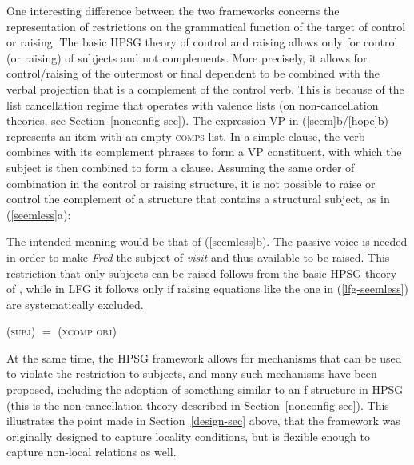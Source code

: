 \noindent
One interesting difference between the two frameworks concerns the representation of restrictions on the grammatical function of the target of control or raising.   The basic HPSG theory of control and raising \citep[for example, the one presented in][132--145]{ps2} allows only for control (or raising) of subjects and not complements.  More precisely, it allows for control/raising of the outermost or final dependent to be combined with the verbal projection that is a complement of the control verb.  This is because of the list cancellation regime that operates with valence lists (on non-cancellation theories, see Section~\ref{nonconfig-sec}).  The expression VP in  (\ref{seem}b/\ref{hope}b) represents an item with an empty \textsc{comps} list.  In a simple  clause, the verb combines with its complement phrases to form a VP constituent, with which the subject is then combined to form a clause.  Assuming the same order of combination in the control or raising structure, it is not possible to raise or control the complement of a structure that contains a structural subject, as in (\ref{seemless}a):

\begin{exe} 
\ex 
\label{seemless}
\begin{xlist}
\end{xlist}
\end{exe}
The intended meaning would be that of (\ref{seemless}b).  The passive voice is needed in order to make \textit{Fred} the subject of \textit{visit} and thus available to be raised.  This restriction that only subjects can be raised follows from the basic HPSG theory of \citet[132-145]{ps2}, while in LFG it follows only if raising equations like the one in (\ref{lfg-seemless}) are systematically excluded.
\begin{exe} 
\ex 
\label{lfg-seemless}
 {(\up \textsc{subj})  $=$  (\up \textsc{xcomp} \textsc{obj})}
\end{exe}
At the same time, the HPSG framework allows for mechanisms that can be used to violate the restriction to subjects, and many such mechanisms have been proposed, including the adoption of something similar to an f-structure in HPSG (this is the non-cancellation theory described in Section~\ref{nonconfig-sec}).  This illustrates the point made in Section~\ref{design-sec} above, that the framework was originally designed to capture locality conditions, but is flexible enough to capture non-local relations as well.  


